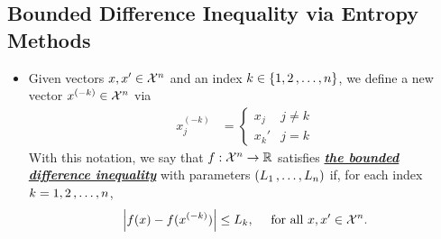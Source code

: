 \documentclass[11pt]{article}
\begin{document}
\subsection{Bounded Difference Inequality via Entropy Methods}
\begin{itemize}
\item \begin{remark}
Given vectors $x, x' \in {\mathcal X}^n$ and an index $k \in \left\{1, 2 \,{,}\ldots{,}\, n\right\}$, we define a new vector $x^{(-k)} \in {\mathcal X}^n$ via
\begin{align*}
x_j^{(-k)} &= \left\{\begin{array}{cc}
x_j & j \neq k\\
x_k'& j = k
\end{array}
\right.
\end{align*}
With this notation, we say that $f: {\mathcal X}^n \to {\mathbb R}$ satisfies \underline{\textbf{\emph{the bounded difference inequality}}} with parameters $(L_1 \,{,}\ldots{,}\, L_n)$ if, for each index $k = 1, 2 \,{,}\ldots{,}\, n$,
\begin{align}
\left\lvert f(x) - f(x^{(-k)}) \right\rvert \le L_k, \quad\text{ for all }x, x' \in {\mathcal X}^n. \label{eqn: bounded_difference_property}
\end{align}
\end{remark}


\end{itemize}
\end{document}
